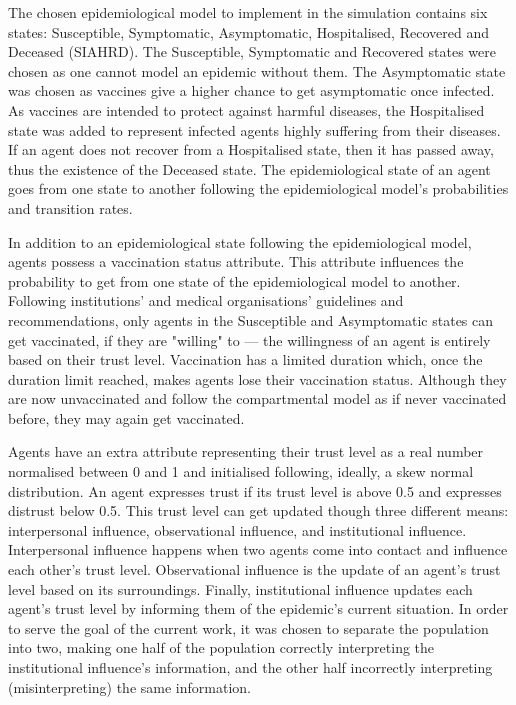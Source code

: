 The chosen epidemiological model to implement in the simulation contains six states: Susceptible, Symptomatic, Asymptomatic, Hospitalised, Recovered and Deceased (SIAHRD). The Susceptible, Symptomatic and Recovered states were chosen as one cannot model an epidemic without them. The Asymptomatic state was chosen as vaccines give a higher chance to get asymptomatic once infected. As vaccines are intended to protect against harmful diseases, the Hospitalised state was added to represent infected agents highly suffering from their diseases. If an agent does not recover from a Hospitalised state, then it has passed away, thus the existence of the Deceased state. The epidemiological state of an agent goes from one state to another following the epidemiological model's probabilities and transition rates.

In addition to an epidemiological state following the epidemiological model, agents possess a vaccination status attribute. This attribute influences the probability to get from one state of the epidemiological model to another. Following institutions’ and medical organisations’ guidelines and recommendations, only agents in the Susceptible and Asymptomatic states can get vaccinated, if they are "willing" to --- the willingness of an agent is entirely based on their trust level. Vaccination has a limited duration which, once the duration limit reached, makes agents lose their vaccination status. Although they are now unvaccinated and follow the compartmental model as if never vaccinated before, they may again get vaccinated.

Agents have an extra attribute representing their trust level as a real number normalised between 0 and 1 and initialised following, ideally, a skew normal distribution. An agent expresses trust if its trust level is above 0.5 and expresses distrust below 0.5. This trust level can get updated though three different means: interpersonal influence, observational influence, and institutional influence. Interpersonal influence happens when two agents come into contact and influence each other's trust level. Observational influence is the update of an agent's trust level based on its surroundings. Finally, institutional influence updates each agent's trust level by informing them of the epidemic's current situation. In order to serve the goal of the current work, it was chosen to separate the population into two, making one half of the population correctly interpreting the institutional influence's information, and the other half incorrectly interpreting (misinterpreting) the same information.

